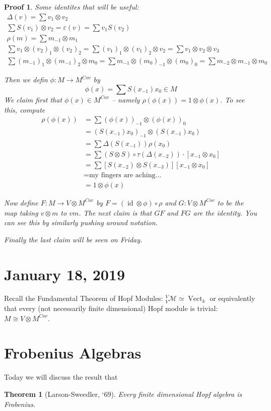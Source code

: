 \documentclass[12pt]{article}
\theoremstyle{break}
\theoremstyle{nonumberbreak}
\theoremstyle{changebreak}
\newtheorem{thm}{Theorem}[subsection]
\theoremstyle{break}
\theoremstyle{nonumberbreak}
\newtheorem{prf}{Proof}
\theoremstyle{nonumberplain}
\theoremstyle{change}
\DeclareMathOperator{\id}{id}
\newcommand*{\Vectk}{\operatorname{Vect}_k}
\begin{document}
\begin{prf}
	Some identites that will be useful:
	\begin{align*}
		\Delta(v)=\sum v_1\otimes v_2\\
		\sum S(v_1)\otimes v_2=\varepsilon(v)=\sum v_1S(v_2)\\
		\rho(m)=\sum m_{-1}\otimes m_1\\
		\sum v_1\otimes (v_2)_1\otimes (v_2)_2=\sum (v_1)_1\otimes (v_1)_2\otimes v_2=\sum v_1\otimes v_2\otimes v_3\\
		\sum (m_{-1})_1\otimes (m_{-1})_2\otimes m_0=\sum m_{-1}\otimes (m_0)_{-1}\otimes (m_0)_0=\sum m_{-2}\otimes m_{-1}\otimes m_0
	\end{align*}

	Then we defin $\phi:M\to M^{Cov}$ by 
	\[\phi(x)=\sum S(x_{-1})x_0\in M\]
	We claim first that $\phi(x)\in M^{Cov}$ -- namely $\rho(\phi(x))=1\otimes\phi(x)$. To see this, compute
	\begin{align*}
		\rho(\phi(x)) &= \sum (\phi(x))_{-1}\otimes (\phi(x))_0\\
		&= (S(x_{-1})x_0)_{-1}\otimes (S(x_{-1})x_0)\\
		&= \sum\Delta(S(x_{-1}))\rho(x_0)\\
		&= \sum (S\otimes S)\circ \tau(\Delta(x_{-2}))\cdot [x_{-1}\otimes x_0]\\
		&=\sum[S(x_{-2})\otimes S(x_{-3})][x_{-1}\otimes x_0]\\
		&= \text{my fingers are aching...}\\
		&= 1\otimes\phi(x)
	\end{align*}

	Now define $F:M\to V\otimes M^{Cov}$ by $F=(\id\otimes\phi)\circ\rho$ and $G:V\otimes M^{Cov}$ 
	to be the map taking $v\otimes m$ to $vm$. The next claim is that $GF$ and $FG$ are the identity.
	You can see this by similarly pushing around notation.
	
	Finally the last claim will be seen on Friday.
\end{prf}
\section{January 18, 2019}
Recall the Fundamental Theorem of Hopf Modules: $_V^V\mathcal{M}\simeq \Vectk$ or equivalently that
every (not necessarily finite dimensional) Hopf module is trivial: $M\cong V\otimes M^{Cov}$.

\section{Frobenius Algebras}
Today we will discuss the result that
\begin{thm}[Larson-Sweedler, `69]\label{LS-69-2}
	Every finite dimensional Hopf algebra is Frobenius.
\end{thm}
\end{document}

